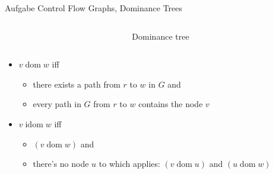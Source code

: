 \begin{frame}[allowframebreaks]{Aufgabe \thesection}{Control Flow Graphs, Dominance Trees}
  \begin{solutionnoinc}
    \begin{columns}
      \begin{column}[t]{0.5\textwidth}
        \domtreecalc
      \end{column}
      \begin{column}[t]{0.5\textwidth}
        \domtable
      \end{column}
    \end{columns}
  \end{solutionnoinc}
  \begin{solutionnoinc}
    \begin{columns}
      \begin{column}[t]{0.5\textwidth}
        \domtable
      \end{column}
      \begin{column}[t]{0.5\textwidth}
        \begin{figure}
          \caption{Dominance tree}
        \end{figure}
      \end{column}
    \end{columns}
  \end{solutionnoinc}

  \setcounter{exercise}{1}

  \begin{solutionnoinc}
    \begin{itemize}
      \item $v \operatorname{dom} w$ \alert{iff}
      \begin{itemize}
        \item \textcolor{SecondaryColor}{there exists a path from $r$ to $w$ in $G$} and
        \item every path in $G$ from $r$ to $w$ contains the node $v$
      \end{itemize}
      \item $v \operatorname{idom} w$ \alert{iff}
      \begin{itemize}
        \item $(v \operatorname{dom} w)$ and
        \item there's no node $u$ to which applies: $(v \operatorname{dom} u)$ and $(u \operatorname{dom} w)$
      \end{itemize}
    \end{itemize}
  \end{solutionnoinc}
\end{frame}
